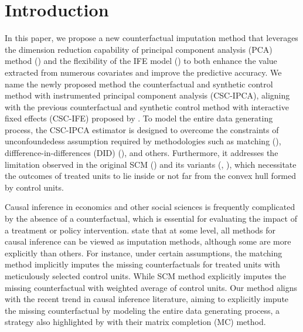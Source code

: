 \documentclass[12pt]{article}
\begin{document}
\doublespacing

\section{Introduction} 
\label{sec:introduction}

In this paper, we propose a new counterfactual imputation method that leverages the dimension reduction capability of principal component analysis (PCA) method (\cite{jollife2016principal}) and the flexibility of the IFE model (\cite{bai2003computation}) to both enhance the value extracted from numerous covariates and improve the predictive accuracy. We name the newly proposed method the counterfactual and synthetic control method with instrumented principal component analysis (CSC-IPCA), aligning with the previous counterfactual and synthetic control method with interactive fixed effects (CSC-IFE) proposed by \cite{xu2017generalized}. To model the entire data generating process, the CSC-IPCA estimator is designed to overcome the constraints of unconfoundedess assumption required by methodologies such as matching (\cite{abadie2011bias, abadie2006large}), diffference-in-differences (DID) (\cite{card1993minimum}), and others. Furthermore, it addresses the limitation observed in the original SCM (\cite{abadie2010synthetic}) and its variants (\cite{ben2021augmented}, \cite{arkhangelsky2021synthetic}), which necessitate the outcomes of treated units to lie inside or not far from the convex hull formed by control units. 

Causal inference in economics and other social sciences is frequently complicated by the absence of a counterfactual, which is essential for evaluating the impact of a treatment or policy intervention. \cite{imbens2015causal} state that at some level, all methods for causal inference can be viewed as imputation methods, although some are more explicitly than others. For instance, under certain assumptions, the matching method implicitly imputes the missing counterfactuals for treated units with meticulously selected control units. While SCM method explicitly imputes the missing counterfactual with weighted average of control units. Our method aligns with the recent trend in causal inference literature, aiming to explicitly impute the missing counterfactual by modeling the entire data generating process, a strategy also highlighted by \cite{athey2021matrix} with their matrix completion (MC) method.
\end{document}
